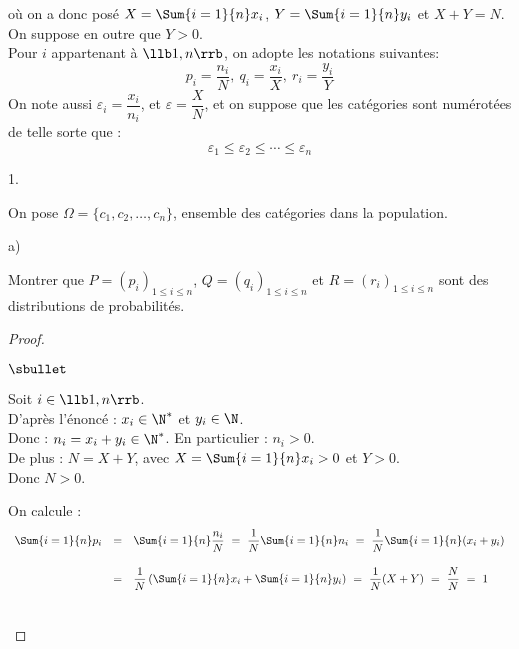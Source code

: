 \noindent
où on a donc posé $X= \Sum{i=1}{n} x_i$, $Y= \Sum{i=1}{n} y_i$ et 
$X+Y=N$. On suppose en outre que $Y>0$. \\
Pour $i$ appartenant à $\llb 1,n\rrb$, on adopte les notations 
suivantes: 
\[
 p_i=\dfrac{n_i}{N}, \ q_i=\dfrac{x_i}{X},  \ r_i=\dfrac{y_i}{Y}
\]
On note aussi $\varepsilon_i= \dfrac{x_i}{n_i}$, et 
$\varepsilon=\dfrac{X}{N}$, et on suppose que les catégories sont 
numérotées de telle sorte que : 
\[
 \varepsilon_1 \leq \varepsilon_2 \leq \cdots \leq \varepsilon_n
\]

\begin{noliste}{1.}
 \setlength{\itemsep}{4mm}
 \setcounter{enumi}{9}
 \item On pose $\Omega=\{c_1,c_2, \ldots ,c_n\}$, ensemble des 
 catégories dans la population.
 \begin{noliste}{a)}
  \setlength{\itemsep}{2mm}
  \item Montrer que $P=(p_i)_{1 \leq i \leq n}$, $Q= (q_i)_{1 \leq i 
  \leq n}$ et $R= (r_i)_{1 \leq i \leq n}$ sont des distributions de 
  probabilités.
  
  \begin{proof}~
    \begin{noliste}{$\sbullet$}
      \item Soit $i\in \llb 1,n \rrb$.\\
      D'après l'énoncé : $x_i
      \in \N^*$ et $y_i \in \N$.\\
      Donc : $n_i =x_i+y_i \in \N^*$. En particulier : $n_i > 0$.\\
      De plus : $N=X+Y$, avec $X= \Sum{i=1}{n} x_i > 0$ et $Y>0$.\\
      Donc $N>0$.
      
      \item On calcule :
      \[
      \begin{array}{rcl}
        \Sum{i=1}{n} p_i & = & \Sum{i=1}{n} \dfrac{n_i}{N} \ = \ 
        \dfrac{1}{N} \Sum{i=1}{n} n_i \ = \ \dfrac{1}{N} \Sum{i=1}{n}
        (x_i+y_i) 
        \\[.6cm]
        & = & \dfrac{1}{N} \left(\Sum{i=1}{n} x_i + 
	\Sum{i=1}{n} y_i \right) \ = \
        \dfrac{1}{N}(X+Y) \ = \ \dfrac{N}{N} \ = \ 1
      \end{array}
      \]
    \end{noliste}
    ~\\[-1cm]
  \end{proof}
  

\end{noliste}
\end{noliste}
